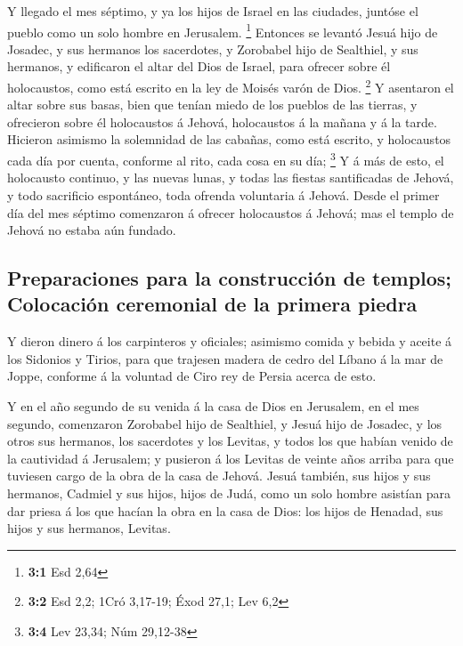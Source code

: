  Y llegado el mes séptimo, y ya los hijos de Israel en las
ciudades, juntóse el pueblo como un solo hombre en Jerusalem.
\footnote{\textbf{3:1} Esd 2,64}  Entonces se levantó Jesuá
hijo de Josadec, y sus hermanos los sacerdotes, y Zorobabel hijo de
Sealthiel, y sus hermanos, y edificaron el altar del Dios de Israel,
para ofrecer sobre él holocaustos, como está escrito en la ley de Moisés
varón de Dios. \footnote{\textbf{3:2} Esd 2,2; 1Cró 3,17-19; Éxod 27,1;
  Lev 6,2}  Y asentaron el altar sobre sus basas, bien que
tenían miedo de los pueblos de las tierras, y ofrecieron sobre él
holocaustos á Jehová, holocaustos á la mañana y á la tarde. 
Hicieron asimismo la solemnidad de las cabañas, como está escrito, y
holocaustos cada día por cuenta, conforme al rito, cada cosa en su día;
\footnote{\textbf{3:4} Lev 23,34; Núm 29,12-38}  Y á más de
esto, el holocausto continuo, y las nuevas lunas, y todas las fiestas
santificadas de Jehová, y todo sacrificio espontáneo, toda ofrenda
voluntaria á Jehová.  Desde el primer día del mes séptimo
comenzaron á ofrecer holocaustos á Jehová; mas el templo de Jehová no
estaba aún fundado.

\hypertarget{preparaciones-para-la-construcciuxf3n-de-templos-colocaciuxf3n-ceremonial-de-la-primera-piedra}{%
\subsection{Preparaciones para la construcción de templos; Colocación
ceremonial de la primera
piedra}\label{preparaciones-para-la-construcciuxf3n-de-templos-colocaciuxf3n-ceremonial-de-la-primera-piedra}}

 Y dieron dinero á los carpinteros y oficiales; asimismo
comida y bebida y aceite á los Sidonios y Tirios, para que trajesen
madera de cedro del Líbano á la mar de Joppe, conforme á la voluntad de
Ciro rey de Persia acerca de esto.

 Y en el año segundo de su venida á la casa de Dios en
Jerusalem, en el mes segundo, comenzaron Zorobabel hijo de Sealthiel, y
Jesuá hijo de Josadec, y los otros sus hermanos, los sacerdotes y los
Levitas, y todos los que habían venido de la cautividad á Jerusalem; y
pusieron á los Levitas de veinte años arriba para que tuviesen cargo de
la obra de la casa de Jehová.  Jesuá también, sus hijos y
sus hermanos, Cadmiel y sus hijos, hijos de Judá, como un solo hombre
asistían para dar priesa á los que hacían la obra en la casa de Dios:
los hijos de Henadad, sus hijos y sus hermanos, Levitas.

